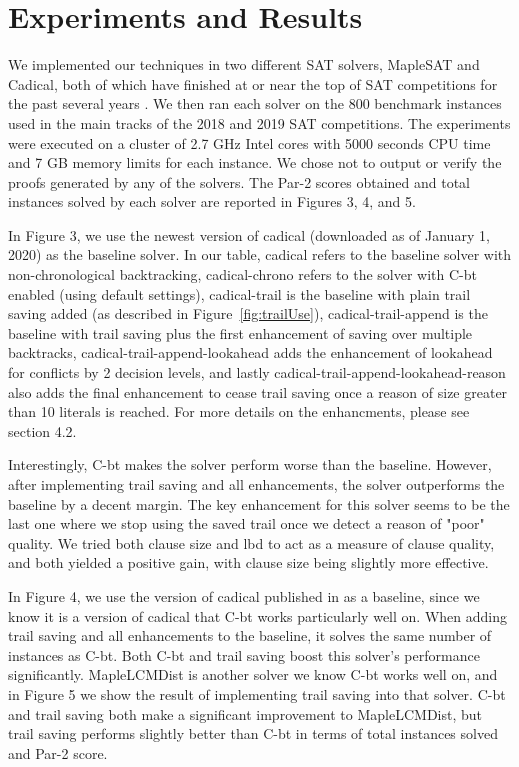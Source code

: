 \documentclass[runningheads]{llncs}
\newcommand{\cbt}{C-bt\xspace}
\begin{document}
\section{Experiments and Results}
We implemented our techniques in two different SAT solvers, MapleSAT and Cadical,
both of which have finished at or near the top of SAT competitions for the past several
years \cite{Heule2019ProceedingsOS}. We then ran each solver on the 800 benchmark instances used
in the main tracks of the 2018 and 2019 SAT competitions. The
experiments were executed on a cluster of 2.7 GHz Intel cores with 5000 seconds CPU time and 7 GB memory limits for each instance. We chose not to output or verify the proofs generated by any of the solvers. The Par-2 scores obtained and total instances solved by each solver are reported in Figures 3, 4, and 5.\newline

In Figure 3, we use the newest version of cadical (downloaded as of January 1, 2020) as the baseline solver. In our table, cadical refers to the baseline solver with non-chronological backtracking, cadical-chrono refers to the solver with \cbt enabled (using default settings), cadical-trail is the baseline with plain trail saving added (as described in Figure~\ref{fig:trailUse}), cadical-trail-append is the baseline with trail saving plus the first enhancement of saving over multiple backtracks, cadical-trail-append-lookahead adds the enhancement of lookahead for conflicts by 2 decision levels, and lastly cadical-trail-append-lookahead-reason also adds the final enhancement to cease trail saving once a reason of size greater than 10 literals is reached. For more details on the enhancments, please see section 4.2.

Interestingly, \cbt makes the solver perform worse than the baseline. However, after implementing trail saving and all enhancements, the solver outperforms the baseline by a decent margin. The key enhancement for this solver seems to be the last one where we stop using the saved trail once we detect a reason of "poor" quality. We tried both clause size and lbd to act as a measure of clause quality, and both yielded a positive gain, with clause size being slightly more effective. \newline

In Figure 4, we use the version of cadical published in
\cite{DBLP:conf/sat/MohleB19} as a baseline, since we know it is a version of cadical that \cbt works particularly well on. When adding trail saving and all enhancements to the baseline, it solves the same number of instances as
\cbt. Both \cbt and trail saving boost this solver's performance significantly. MapleLCMDist is another solver we know \cbt works well on, and in Figure 5 we show the result of implementing trail saving into that solver. \cbt and trail saving both make a significant improvement to MapleLCMDist, but trail saving performs slightly better than \cbt in terms of total instances solved and Par-2 score.\newline
\end{document}
